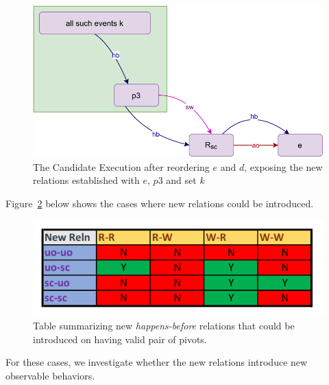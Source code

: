     \begin{figure}[H]
        \centering
        \includegraphics[scale=0.7]{5.InstructionReordering/4.ValidReorderingCandidate/ProofParts/Part2/part2(d).pdf}
        \caption{The Candidate Execution after reordering $e$ and $d$, exposing the new relations established with $e$, $p3$ and set $k$}
        \label{reord:add_reln(b)}
    \end{figure}

    Figure~\ref{reord:add_reln_table} below shows the cases where new relations could be introduced. 
    \begin{figure}[H]
        \centering
        \includegraphics[scale=0.7]{5.InstructionReordering/4.ValidReorderingCandidate/ProofParts/Part2/part2_table.pdf}
        \caption{Table summarizing new \textit{happens-before} relations that could be introduced on having valid pair of pivots.}
        \label{reord:add_reln_table}
    \end{figure}

    For these cases, we investigate whether the new relations introduce new observable behaviors. 
